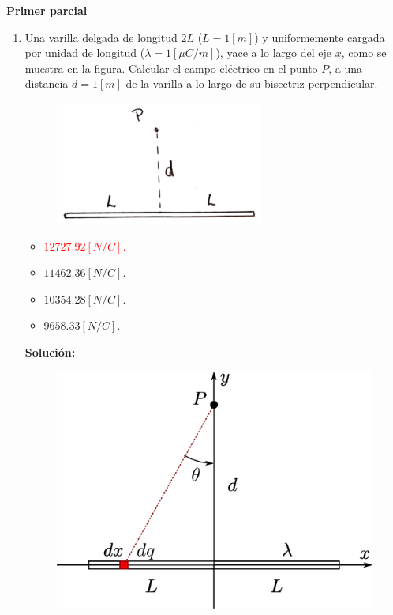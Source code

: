 \documentclass[letter,11pt]{article}
\begin{document}
\begin{center}
    {\Large \bf{Primer parcial}}
\end{center}

\noindent{}

\vspace{0.5cm}

\begin{enumerate}
\item Una varilla delgada de longitud $2L$ ($L = 1 [m]$) y uniformemente cargada
por unidad de longitud ($\lambda = 1 [\mu C/m]$), yace a lo largo del eje $x$,
como se muestra en la figura. Calcular el campo eléctrico en el punto $P$, a una
distancia $d = 1 [m]$ de la varilla a lo largo de su bisectriz perpendicular.

\begin{figure}[!h]
\centering
\includegraphics[scale=1.60]{resources/q1.eps}
\end{figure}

\begin{itemize}
    \item \textcolor{red}{$12727.92 [N/C]$.}
    \item $11462.36 [N/C]$.
    \item $10354.28 [N/C]$.
    \item $ 9658.33 [N/C]$.
\end{itemize}

\textbf{Solución:} \\

\begin{figure}[!h]
\centering
\includegraphics[scale=0.39]{resources/a1.eps}
\end{figure}


\end{enumerate}
\end{document}
